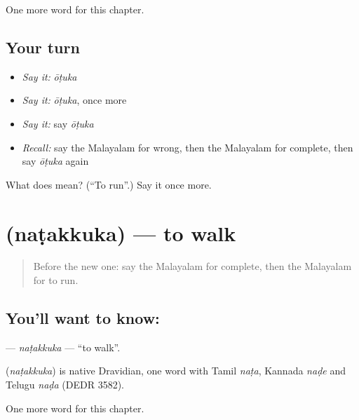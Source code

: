 \begin{grammarlens}[title={What you've built}]
One more word for this chapter.
\end{grammarlens}

\subsection*{Your turn}
\begin{itemize}
\raggedright
  \item \emph{Say it:} \emph{ōṭuka}
  \item \emph{Say it:} \emph{ōṭuka}, once more
  \item \emph{Say it:} say \emph{ōṭuka}
  \item \emph{Recall:} say the Malayalam for wrong, then the Malayalam for complete, then say \emph{ōṭuka} again
\end{itemize}

\begin{tcolorbox}[breakable,colback=teal!4,colframe=teal!35!black,title={Before you move on}]
What does  mean? (\textquotedblleft{}To run\textquotedblright{}.) Say it once more.
\end{tcolorbox}
\section[\texorpdfstring{\ml{നടക്കുക} (naṭakkuka)}{നടക്കുക (naṭakkuka)}]{ (naṭakkuka) — to walk}

\label{lesson:ML-C170-natakkuka}



\begin{quote}
Before the new one: say the Malayalam for complete, then the Malayalam for to run.
\end{quote}

\subsection*{You'll want to know: }
\textbf{} — \emph{naṭakkuka} — \textquotedblleft{}to walk\textquotedblright{}.

\begin{cousinweb}
\textbf{} (\emph{naṭakkuka}) is native Dravidian, one word with Tamil \emph{naṭa}, Kannada \emph{naḍe} and Telugu \emph{naḍa} (DEDR 3582).
\end{cousinweb}

\begin{grammarlens}[title={What you've built}]
One more word for this chapter.
\end{grammarlens}

